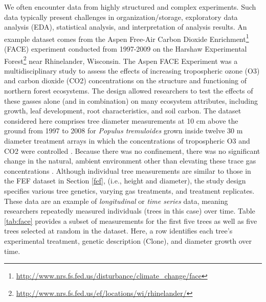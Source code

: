 \documentclass[
  11pt,
]{krantz}
\renewcommand{\href}[2]{#2\footnote{\url{#1}}}
\theoremstyle{definition}
\theoremstyle{definition}
\theoremstyle{definition}
\theoremstyle{definition}
\theoremstyle{remark}
\begin{document}
We often encounter data from highly structured and complex experiments. Such data typically present challenges in organization/storage, exploratory data analysis (EDA), statistical analysis, and interpretation of analysis results. An example dataset comes from the Aspen \href{http://www.nrs.fs.fed.us/disturbance/climate_change/face}{Free-Air Carbon Dioxide Enrichment} (FACE) experiment conducted from 1997-2009 on the \href{http://www.nrs.fs.fed.us/ef/locations/wi/rhinelander/}{Harshaw Experimental Forest} near Rhinelander, Wisconsin. The Aspen FACE Experiment was a multidisciplinary study to assess the effects of increasing tropospheric ozone (O3) and carbon dioxide (CO2) concentrations on the structure and functioning of northern forest ecosystems. The design allowed researchers to test the effects of these gasses alone (and in combination) on many ecosystem attributes, including growth, leaf development, root characteristics, and soil carbon. The dataset considered here comprises tree diameter measurements at 10 cm above the ground from 1997 to 2008 for \emph{Populus tremuloides} grown inside twelve 30 m diameter treatment arrays in which the concentrations of tropospheric O3 and CO2 were controlled \citep{Kubiske2013}. Because there was no confinement, there was no significant change in the natural, ambient environment other than elevating these trace gas concentrations \citep{hendrey1999free}. Although individual tree measurements are similar to those in the FEF dataset in Section \ref{fef}, (i.e., height and diameter), the study design specifies various tree genetics, varying gas treatments, and treatment replicates. These data are an example of \emph{longitudinal} or \emph{time series} data, meaning researchers repeatedly measured individuals (trees in this case) over time. Table \ref{tab:face} provides a subset of measurements for the first five trees as well as five trees selected at random in the dataset. Here, a row identifies each tree's experimental treatment, genetic description (Clone), and diameter growth over time.
\end{document}
